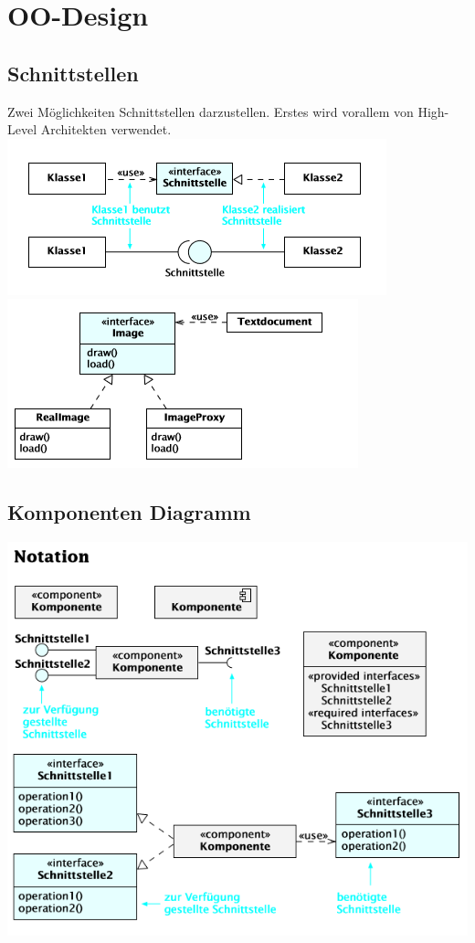 \section{OO-Design}
\subsection{Schnittstellen}
Zwei Möglichkeiten Schnittstellen darzustellen. Erstes wird vorallem von High-Level Architekten verwendet.\\
\includegraphics[width=\columnwidth]{Images/schnitstellen}
\includegraphics[width=\columnwidth]{Images/schnittstelle_beispiel}

\subsection{Komponenten Diagramm}
\begin{center}
	\includegraphics[width=0.9\columnwidth]{Images/komponentdiagramm}
\end{center}

